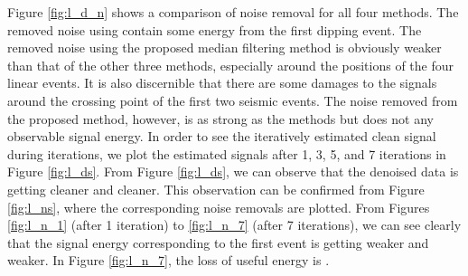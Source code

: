 Figure \ref{fig:l_d_n} shows a comparison of noise removal for all four methods. The removed noise using  contain some  energy from the first dipping event. The removed noise using the proposed median filtering method is obviously weaker than that of the other three methods, especially around the positions of the four linear events. It is also discernible that there are some damages to the signals around the crossing point of the first two seismic events. The noise removed from the proposed method, however, is as strong as the  methods but does not  any observable signal energy. In order to see the iteratively estimated clean signal during iterations, we plot the estimated signals after 1, 3, 5, and 7 iterations in Figure \ref{fig:l_ds}. From Figure \ref{fig:l_ds}, we can observe that the denoised data is getting cleaner and cleaner. This observation can be confirmed from Figure \ref{fig:l_ns}, where the corresponding noise removals are plotted. From Figures \ref{fig:l_n_1} (after 1 iteration) to \ref{fig:l_n_7} (after 7 iterations), we can see clearly that the signal energy corresponding to the first event is getting weaker and weaker. In Figure \ref{fig:l_n_7}, the loss of useful energy is .

